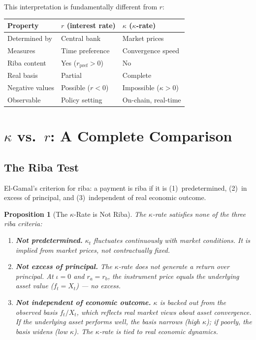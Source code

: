 \documentclass[10pt,twocolumn]{article}
\theoremstyle{plain}
\newtheorem{proposition}{Proposition}
\theoremstyle{definition}
\begin{document}
This interpretation is fundamentally different from $r$:
\begin{center}
\small
\begin{tabular}{@{}lll@{}}
\toprule
\textbf{Property} & \textbf{$r$ (interest rate)} & \textbf{$\kappa$ ($\kappa$-rate)} \\
\midrule
Determined by & Central bank & Market prices \\
Measures & Time preference & Convergence speed \\
Riba content & Yes ($r_{\text{pref}} > 0$) & No \\
Real basis & Partial & Complete \\
Negative values & Possible ($r < 0$) & Impossible ($\kappa > 0$) \\
Observable & Policy setting & On-chain, real-time \\
\bottomrule
\end{tabular}
\end{center}

\section{$\kappa$ vs.\ $r$: A Complete Comparison}
\label{sec:kappa_vs_r}

\subsection{The Riba Test}

El-Gamal's \cite{ElGamal2006} criterion for riba: a payment
is riba if it is (1)~predetermined, (2)~in excess of principal,
and (3)~independent of real economic outcome.

\begin{proposition}[The $\kappa$-Rate is Not Riba]
\label{prop:not_riba}
The $\kappa$-rate satisfies none of the three riba criteria:
\begin{enumerate}[leftmargin=*,noitemsep]
\item \textbf{Not predetermined.} $\kappa_t$ fluctuates
continuously with market conditions. It is implied from
market prices, not contractually fixed.
\item \textbf{Not excess of principal.} The $\kappa$-rate
does not generate a return over principal. At $\iota = 0$
and $r_a = r_b$, the instrument price equals the underlying
asset value ($f_t = X_t$) --- no excess.
\item \textbf{Not independent of economic outcome.}
$\kappa$ is backed out from the observed basis $f_t / X_t$,
which reflects real market views about asset convergence. If
the underlying asset performs well, the basis narrows (high
$\kappa$); if poorly, the basis widens (low $\kappa$). The
$\kappa$-rate is tied to real economic dynamics.
\end{enumerate}
\end{proposition}
\end{document}
